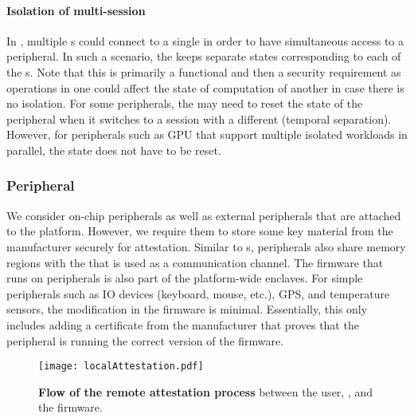 \paragraph*{Isolation of multi-\app session} In \name, multiple \app{}s could connect to a single \ce in order to have simultaneous access to a peripheral. In such a scenario, the \ce keeps separate states corresponding to each of the \app{}s. Note that this is primarily a functional and then a security requirement as operations in one \app could affect the state of computation of another \app in case there is no isolation. For some peripherals, the \ce may need to reset the state of the peripheral when it switches to a session with a different \app (temporal separation). However, for peripherals such as GPU that support multiple isolated workloads in parallel, the state does not have to be reset.



\subsubsection{Peripheral} 
\label{sec:programmingModel:systemComponents:peripheral}

We consider on-chip peripherals as well as external peripherals that are attached to the platform. However, we require them to store some key material from the manufacturer securely for attestation. Similar to \app{}s, peripherals also share memory regions with the \ce that is used as a communication channel. The firmware that runs on peripherals is also part of the platform-wide enclaves. For simple peripherals such as IO devices (keyboard, mouse, etc.), GPS, and temperature sensors, the modification in the firmware is minimal. Essentially, this only includes adding a certificate from the manufacturer that proves that the peripheral is running the correct version of the firmware. %

\begin{figure}[t]
  \centering
  \texttt{[image: localAttestation.pdf]}
  \caption{\textbf{Flow of the remote attestation process} between the user, \ce, \app and the firmware.} \vspace{-1.5em}
  \label{fig:attestationFlow}
\end{figure}

